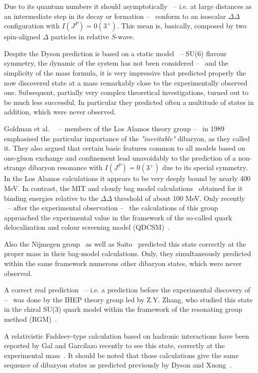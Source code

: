 Due to its quantum numbers it should asymptotically \ -- i.e. at large distances as an intermediate
step in its decay or formation -- \ conform to an isoscalar $\Delta \Delta$configuration with
$I(J^{P}) = 0(3^{+})$. This mean is, basically, composed by two spin-aligned $\Delta$ particles
in relative $S$-wave.

Despite the Dyson prediction is based on a static model \ -- SU(6) flavour symmetry, the dynamic
of the system has not been considered -- \ and the simplicity of the mass formula, it is very 
impressive that predicted properly the now discovered state \dst at a mass remarkably close to the
experimentally observed one. 
Subsequent, partially very complex theoretical investigations, turned out to be much less successful.
In particular they predicted often a multitude of states in addition, which were never observed.

Goldman et al.~\cite{dsinevitable1} \ -- members of the Los Alamos theory group -- \ in 1989 emphasised
the particular importance of the \textit{"inevitable"} \ds dibaryon, as they called it.
They also argued that certain basic features common to all models based on one-gluon exchange
and confinement lead unavoidably to the prediction of a non-strange dibaryon resonance \ds 
with $I(J^{P}) = 0(3^{+})$ due to its special symmetry.
In the Los Alamos calculations it appears to be very deeply bound by nearly 400 MeV.
In contrast, the MIT and cloudy bag model calculations~\cite{dibpred2,dibpred5,dibpred6}
obtained for it binding energies relative to the
$\Delta \Delta$ threshold of about 100 MeV.
Only recently \ -- after the experimental observation -- \ the calculations of this group approached
the experimental value in the framework of the so-called quark delocalization and colour screening model
(QDCSM)~\cite{dsqm1}.

Also the Nijmegen group~\cite{dibpred1,dibpred2,dibpred3} as well as Saito~\cite{dibpred6} predicted
this state correctly at the proper mass in their bag-model calculations. Only, they simultaneously predicted
within the same framework numerous other dibaryon states, which were never observed.

A correct real prediction \ -- i.e. a prediction before the experimental discovery of \dst -- \ was done 
by the IHEP theory group led by Z.Y. Zhang, who studied this state in the chiral SU(3) quark model within
the framework of the resonating group method (RGM)~\cite{dsqm2}.

A relativistic Faddeev-type calculation based on hadronic interactions have been reported by Gal and Garcilazo
recently to see this state, correctly at the experimental mass~\cite{reanalysis,haddin,haddin1}. 
It should be noted that those calculations give the same sequence of dibaryon states as predicted previously by 
Dyson and Xuong~\cite{dysonxuong}.


